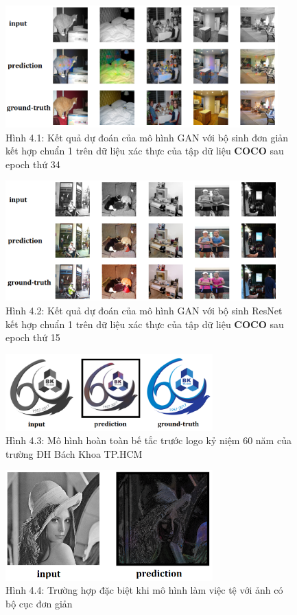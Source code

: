 \documentclass[a4paper]{article}
\begin{document}
\begin{figure}[h!]
\centering
\includegraphics[width=10.5cm]{images/4_0.png}
\caption*{Hình 4.1: Kết quả dự đoán của mô hình GAN với bộ sinh đơn giản kết hợp chuẩn 1 trên dữ liệu xác thực của tập dữ liệu \textbf{COCO} sau epoch thứ 34}
\end{figure}

\begin{figure}[h!]
\centering
\includegraphics[width=10.5cm]{images/4_1.png}
\caption*{Hình 4.2: Kết quả dự đoán của mô hình GAN với bộ sinh ResNet kết hợp chuẩn 1 trên dữ liệu xác thực của tập dữ liệu \textbf{COCO} sau epoch thứ 15}
\end{figure}

\begin{figure}[h!]
\centering
\includegraphics[width=8cm]{images/4_12.PNG}
\caption*{Hình 4.3: Mô hình hoàn toàn bế tắc trước logo kỷ niệm 60 năm của trường ĐH Bách Khoa TP.HCM}
\end{figure}

\begin{figure}[h!]
\centering
\includegraphics[width=8cm]{images/4_13.png}
\caption*{Hình 4.4: Trường hợp đặc biệt khi mô hình làm việc tệ với ảnh có bộ cục đơn giản}
\end{figure}
\end{document}
